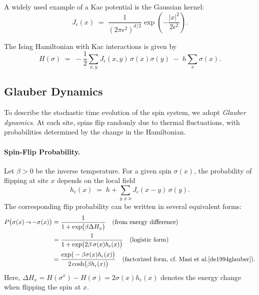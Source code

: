 \documentclass[11pt,a4paper]{article}
\begin{document}
A widely used example of a Kac potential is the Gaussian kernel:
\begin{equation}\label{eq:J-Gaussian}
J_\epsilon(x) \;=\; \frac{1}{(2\pi\epsilon^2)^{d/2}} 
\exp\!\left(-\frac{|x|^2}{2\epsilon^2}\right).
\end{equation}

The Ising Hamiltonian with Kac interactions is given by
\begin{equation}\label{eq:H-Kac}
    H(\sigma) \;=\; -\frac{1}{2}\sum_{x,y} J_\epsilon(x,y)\,\sigma(x)\sigma(y) \;-\; h \sum_{x} \sigma(x).
\end{equation}

\subsection{Glauber Dynamics}
\label{sec:glauber}
To describe the stochastic time evolution of the spin system, we adopt \emph{Glauber dynamics}. 
At each site, spins flip randomly due to thermal fluctuations, with probabilities determined by the change in the Hamiltonian.

\paragraph{Spin-Flip Probability.}  
Let $\beta > 0$ be the inverse temperature. 
For a given spin $\sigma(x)$, the probability of flipping at site $x$ depends on the local field
\begin{equation}\label{eq:hloc}
    h_{\epsilon}(x) \;=\; h + \sum_{y\neq x} J_\epsilon(x-y)\,\sigma(y).
\end{equation}
The corresponding flip probability can be written in several equivalent forms:
\begin{equation}\label{eq:flip-prob}
\begin{split}
    P\big(\sigma(x)\!\to\!-\sigma(x)\big) 
    &= \frac{1}{1 + \exp\!\big(\beta \Delta H_x\big)} 
        \quad \text{(from energy difference)} \\
    &= \frac{1}{1 + \exp\!\big(2\beta\,\sigma(x) h_{\epsilon}(x)\big)} 
        \quad \text{(logistic form)} \\
    &= \frac{\exp\!\big(-\beta\sigma(x) h_{\epsilon}(x)\big)}
            {2\cosh\!\big(\beta h_{\epsilon}(x)\big)} 
        \quad \text{(factorized form, cf.~Masi et al.\cite{de1994glauber})}.
\end{split}
\end{equation}
Here, $\Delta H_x = H(\sigma^x) - H(\sigma) = 2\sigma(x)h_\epsilon(x)$ denotes the energy change when flipping the spin at $x$.
\end{document}
